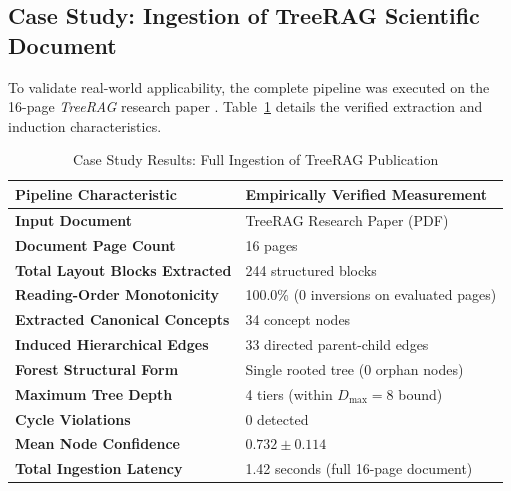 \documentclass[12pt,a4paper]{report}
\begin{document}
\subsection{Case Study: Ingestion of TreeRAG Scientific Document}
To validate real-world applicability, the complete pipeline was executed on the 16-page \textit{TreeRAG} research paper \cite{tao2025treerag}. Table~\ref{tab:case_study} details the verified extraction and induction characteristics.

\begin{table}[h!]
\centering
\caption{Case Study Results: Full Ingestion of TreeRAG Publication}
\label{tab:case_study}
\begin{tabular}{ll}
\hline
\textbf{Pipeline Characteristic} & \textbf{Empirically Verified Measurement} \\ \hline
\textbf{Input Document} & TreeRAG Research Paper (PDF) \\
\textbf{Document Page Count} & 16 pages \\
\textbf{Total Layout Blocks Extracted} & 244 structured blocks \\
\textbf{Reading-Order Monotonicity} & 100.0\% (0 inversions on evaluated pages) \\
\textbf{Extracted Canonical Concepts} & 34 concept nodes \\
\textbf{Induced Hierarchical Edges} & 33 directed parent-child edges \\
\textbf{Forest Structural Form} & Single rooted tree (0 orphan nodes) \\
\textbf{Maximum Tree Depth} & 4 tiers (within $D_{\max} = 8$ bound) \\
\textbf{Cycle Violations} & 0 detected \\
\textbf{Mean Node Confidence} & $0.732 \pm 0.114$ \\
\textbf{Total Ingestion Latency} & 1.42 seconds (full 16-page document) \\ \hline
\end{tabular}
\end{table}
\end{document}

